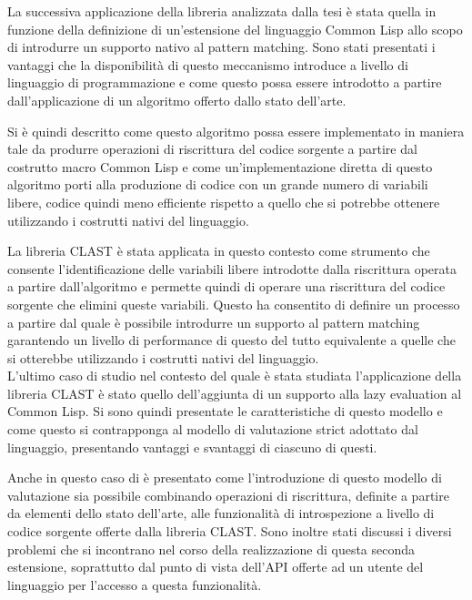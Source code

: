 \documentclass{book}
\begin{document}
La successiva applicazione della libreria analizzata dalla tesi è stata quella
in funzione della definizione di un'estensione del linguaggio Common Lisp allo
scopo di introdurre un supporto nativo al pattern matching. Sono stati
presentati i vantaggi che la disponibilità di questo meccanismo introduce a
livello di linguaggio di programmazione e come questo possa essere introdotto a
partire dall'applicazione di un algoritmo offerto dallo stato dell'arte.

Si è quindi descritto come questo algoritmo possa essere implementato in maniera
tale da produrre operazioni di riscrittura del codice sorgente a partire dal
costrutto macro Common Lisp e come un'implementazione diretta di questo
algoritmo porti alla produzione di codice con un grande numero di variabili
libere, codice quindi meno efficiente rispetto a quello che si potrebbe ottenere
utilizzando i costrutti nativi del linguaggio.

La libreria CLAST è stata applicata in questo contesto come strumento che
consente l'identificazione delle variabili libere introdotte dalla riscrittura
operata a partire dall'algoritmo e permette quindi di operare una riscrittura
del codice sorgente che elimini queste variabili. Questo ha consentito di
definire un processo a partire dal quale è possibile introdurre un supporto al
pattern matching garantendo un livello di performance di questo del tutto
equivalente a quelle che si otterebbe utilizzando i costrutti nativi del
linguaggio.\\

L'ultimo caso di studio nel contesto del quale è stata studiata l'applicazione
della libreria CLAST è stato quello dell'aggiunta di un supporto alla lazy
evaluation al Common Lisp. Si sono quindi presentate le caratteristiche di
questo modello e come questo si contrapponga al modello di valutazione strict
adottato dal linguaggio, presentando vantaggi e svantaggi di ciascuno di questi.

Anche in questo caso di è presentato come l'introduzione di questo modello di
valutazione sia possibile combinando operazioni di riscrittura, definite a
partire da elementi dello stato dell'arte, alle funzionalità di introspezione a
livello di codice sorgente offerte dalla libreria CLAST. Sono inoltre stati
discussi i diversi problemi che si incontrano nel corso della realizzazione di
questa seconda estensione, soprattutto dal punto di vista dell'API offerte ad un
utente del linguaggio per l'accesso a questa funzionalità.\\
\end{document}
